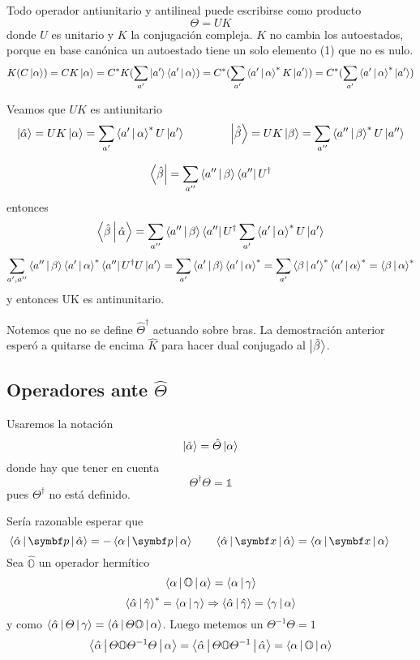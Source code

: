 \documentclass[10pt,oneside]{CBFT_book}
\begin{document}
Todo operador antiunitario y antilineal puede escribirse como producto 
\[
	\Theta = U K
\]
donde $U$ es unitario y $K$ la conjugación compleja. $K$ no cambia los autoestados, porque en base canónica 
un autoestado tiene un solo elemento (1) que no es nulo.
\[
	K(C\Ket{\alpha}) = CK\Ket{\alpha} = C^*K(\sum_{a'} \Ket{a'}\Braket{a'|\alpha}) =
	C^* (\sum_{a'} \Braket{a'|\alpha}^* K \Ket{a'}) =
	C^* (\sum_{a'} \Braket{a'|\alpha}^* \Ket{a'}) 
\]

Veamos que $UK$ es antiunitario 
\[
	\Ket{\hat{\alpha}} = UK \Ket{\alpha} = \sum_{a'} \Braket{a'|\alpha}^* U\Ket{a'} \qquad \qquad
	\Ket{\hat{\beta}} = UK \Ket{\beta} = \sum_{a''} \Braket{a''|\beta}^* U\Ket{a''}
\]

\[
	\Bra{\hat{\beta}} = \sum_{a''} \Braket{a''|\beta} \Bra{a''}U^\dagger
\]
entonces
\[
	\Braket{\hat{\beta}|\hat{\alpha}} = \sum_{a''} \Braket{a''|\beta} \Bra{a''}U^\dagger
	\sum_{a'} \Braket{a'|\alpha}^* U\Ket{a'}
\]
\[
	\sum_{a',a''} \Braket{a''|\beta} \Braket{a'|\alpha}^* \Bra{a''}U^\dagger U\Ket{a'} =
	\sum_{a'} \Braket{a'|\beta} \Braket{a'|\alpha}^* =  \sum_{a'} \Braket{\beta|a'}^* \Braket{a'|\alpha}^*
	= \Braket{\beta|\alpha}^*
\]
y entonces UK es antinunitario.

Notemos que no se define $\hat{\Theta}^\dagger$ actuando sobre bras. La demostración anterior esperó a 
quitarse de encima $\hat{K}$ para hacer dual conjugado al $\Ket{\tilde{\beta}}$.

\subsection{Operadores ante $\hat{\Theta}$}

Usaremos la notación 
\[
	\Ket{\tilde{\alpha}} = \hat{\Theta} \Ket{\alpha}
\]
donde hay que tener en cuenta 
\[
	\Theta^\dagger \Theta = \mathbb{1}
\]
pues $\Theta^\dagger$ no está definido.

Sería razonable esperar que 
\[
	\Braket{\hat{\alpha}|\vb{p}|\hat{\alpha}} = - \Braket{{\alpha}|\vb{p}|{\alpha}}\qquad 
	\Braket{\hat{\alpha}|\vb{x}|\hat{\alpha}} = \Braket{{\alpha}|\vb{x}|{\alpha}}\qquad 
\]
Sea $\hat{\mathbb{O}}$ un operador hermítico 
\[
	\Braket{\alpha|\mathbb{O}|\alpha} = \Braket{\alpha|\gamma}
\]
\[
	\Braket{\hat{\alpha}|\hat{\gamma}}^* = \Braket{\alpha|\gamma} \Rightarrow 
	\Braket{\hat{\alpha}|\hat{\gamma}} = \Braket{\gamma|\alpha}
\]
y como $\Braket{\hat{\alpha}|\Theta|\gamma} = \Braket{\hat{\alpha}|\Theta\mathbb{O}|\alpha}$.
Luego metemos un $\Theta^{-1}\Theta = 1$
\[
	\Braket{\hat{\alpha}|\Theta\mathbb{O}\Theta^{-1}\Theta|\alpha} =
	\Braket{\hat{\alpha}|\Theta\mathbb{O}\Theta^{-1}|\hat{\alpha}} = \Braket{\alpha|\mathbb{O}|\alpha}
\]
\end{document}
